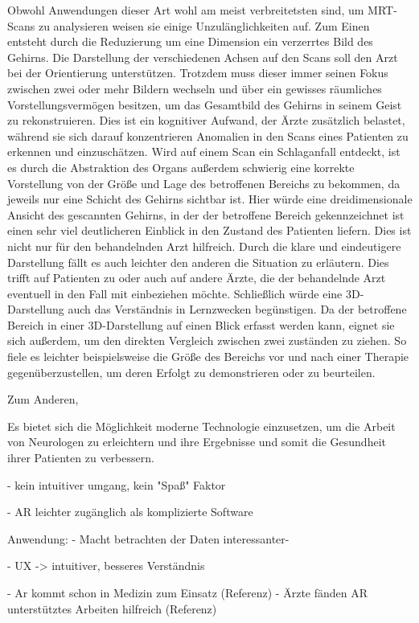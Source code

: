 Obwohl Anwendungen dieser Art wohl am meist verbreitetsten sind, um MRT-Scans zu analysieren 
weisen sie einige Unzulänglichkeiten auf.
Zum Einen entsteht durch die Reduzierung um eine Dimension ein verzerrtes Bild des Gehirns. Die Darstellung der verschiedenen Achsen auf den Scans soll den Arzt bei der Orientierung unterstützen. Trotzdem muss dieser immer seinen Fokus zwischen zwei oder mehr Bildern wechseln und über ein gewisses räumliches Vorstellungsvermögen besitzen, um das Gesamtbild des Gehirns in seinem Geist zu rekonstruieren. Dies ist ein kognitiver Aufwand, der Ärzte zusätzlich belastet, während sie sich darauf konzentrieren Anomalien in den Scans eines Patienten zu erkennen und einzuschätzen. 
Wird auf einem Scan ein Schlaganfall entdeckt, ist es durch die Abstraktion des Organs außerdem schwierig eine korrekte Vorstellung von der Größe und Lage des betroffenen Bereichs zu bekommen, da jeweils nur eine Schicht des Gehirns sichtbar ist. 
Hier würde eine dreidimensionale Ansicht des gescannten Gehirns, in der der betroffene Bereich gekennzeichnet ist einen sehr viel deutlicheren Einblick in den Zustand des Patienten liefern. Dies ist nicht nur für den behandelnden Arzt hilfreich. Durch die klare und eindeutigere Darstellung fällt es auch leichter den anderen die Situation zu erläutern. Dies trifft auf Patienten zu oder auch auf andere Ärzte, die der behandelnde Arzt eventuell in den Fall mit einbeziehen möchte. Schließlich würde eine 3D-Darstellung auch das Verständnis in Lernzwecken begünstigen.
Da der betroffene Bereich in einer 3D-Darstellung auf einen Blick erfasst werden kann, eignet sie sich außerdem, um den direkten Vergleich zwischen zwei zuständen zu ziehen. So fiele es leichter beispielsweise die Größe des Bereichs vor und nach einer Therapie gegenüberzustellen, um deren Erfolgt zu demonstrieren oder zu beurteilen.

Zum Anderen, 

Es bietet sich die Möglichkeit moderne Technologie einzusetzen, um die Arbeit von Neurologen zu erleichtern und ihre Ergebnisse und somit die Gesundheit ihrer Patienten zu verbessern.


- kein intuitiver umgang, kein "Spaß" Faktor

- AR leichter zugänglich als komplizierte Software

Anwendung:
- Macht betrachten der Daten interessanter- 

- UX -> intuitiver, besseres Verständnis

- Ar kommt schon in Medizin zum Einsatz (Referenz)
- Ärzte fänden AR unterstütztes Arbeiten hilfreich (Referenz)



